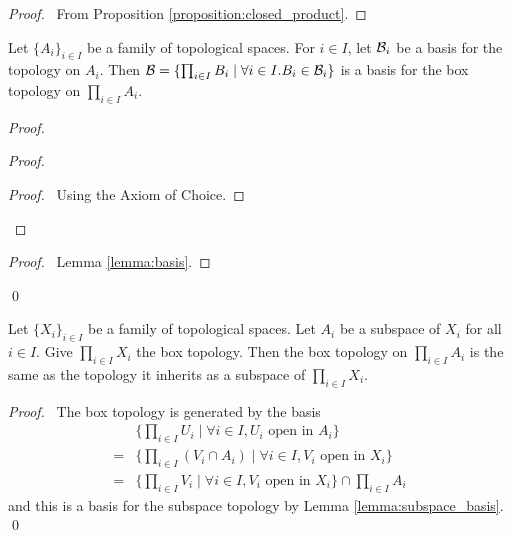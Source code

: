 \begin{proof}
    \pf\ From Proposition \ref{proposition:closed_product}.
\end{proof}

\begin{proposition}[AC]
    Let $\{ A_i \}_{i \in I}$ be a family of topological spaces. For $i \in I$, let $\mathcal{B}_i$ be a basis for the topology on $A_i$. Then $\mathcal{B} = \{ \prod_{i \in I} B_i \mid
    \forall i \in I. B_i \in \mathcal{B}_i \}$ is a basis for the box topology on $\prod_{i \in I} A_i$.
\end{proposition}

\begin{proof}
    \pf
    \begin{proof}
        \begin{proof}
            \pf\ Using the Axiom of Choice.
        \end{proof}
    \end{proof}
    \qedstep
    \begin{proof}
        \pf\ Lemma \ref{lemma:basis}.
    \end{proof}
    \qed
\end{proof}

\begin{theorem}
    Let $\{ X_i \}_{i \in I}$ be a family of topological spaces. Let $A_i$ be a subspace of $X_i$ for all $i \in I$.
    Give $\prod_{i \in I} X_i$ the box topology.
    Then the box topology on $\prod_{i \in I} A_i$ is the same as the topology it inherits as a subspace of
    $\prod_{i \in I} X_i$.
\end{theorem}

\begin{proof}
    \pf\ The box topology is generated by the basis
    \begin{align*}
        & \{ \prod_{i \in I} U_i \mid \forall i \in I, U_i \text{ open in } A_i \} \\
        = & \{ \prod_{i \in I} (V_i \cap A_i) \mid \forall i \in I, V_i \text{ open in } X_i \} \\
        = & \{ \prod_{i \in I} V_i \mid \forall i \in I, V_i \text{ open in } X_i \} \cap \prod_{i \in I} A_i
    \end{align*}
    and this is a basis for the subspace topology by Lemma \ref{lemma:subspace_basis}. \qed
\end{proof}

